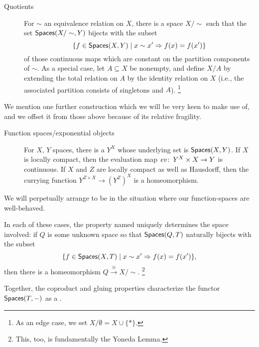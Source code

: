 \begin{description}
    \item[Quotients]
    For $\sim$ an equivalence relation on $X$, there is a space $X / \sim$ such that the set $\mathsf{Spaces}(X / \sim, Y)$ bijects with the subset \[\{f \in \mathsf{Spaces}(X, Y) \mid x \sim x' \Rightarrow f(x) = f(x')\}\] of those continuous maps which are constant on the partition components of $\sim$.
    As a special case, let $A \subseteq X$ be nonempty, and define $X/A$ by extending the total relation on $A$ by the identity relation on $X$ (i.e., the associated partition consists of singletons and $A$).
    \footnote{As an edge case, we set $X / \emptyset = X \cup \{*\}$.}
\end{description}

We mention one further construction which we will be very keen to make use of, and we offset it from those above because of its relative fragility.

\begin{description}
    \item[Function spaces/exponential objects]
    For $X$, $Y$ spaces, there is a  $Y^X$ whose underlying set is $\mathsf{Spaces}(X, Y)$.
    If $X$ is locally compact, then the evaluation map $\mathit{ev}\colon\thinspace Y^X \times X \to Y$ is continuous.
    If $X$ and $Z$ are locally compact as well as Hausdorff, then the currying function $Y^{Z \times X} \to (Y^Z)^X$ is a homeomorphism.
\end{description}

\noindent
We will perpetually arrange to be in the situation where our function-spaces are well-behaved.

\begin{remark}
In each of these cases, the property named uniquely determines the space involved: if $Q$ is some unknown space so that $\mathsf{Spaces}(Q, T)$ naturally bijects with the subset \[\{f \in \mathsf{Spaces}(X, T) \mid x \sim x' \Rightarrow f(x) = f(x') \},\] then there is a homeomorphism $Q \xrightarrow\cong X/\sim$.
\footnote{This, too, is fundamentally the Yoneda Lemma.}
\end{remark}

\begin{remark}
Together, the coproduct and gluing properties characterize the functor $\mathsf{Spaces}(T, -)$ as a .
\end{remark}

